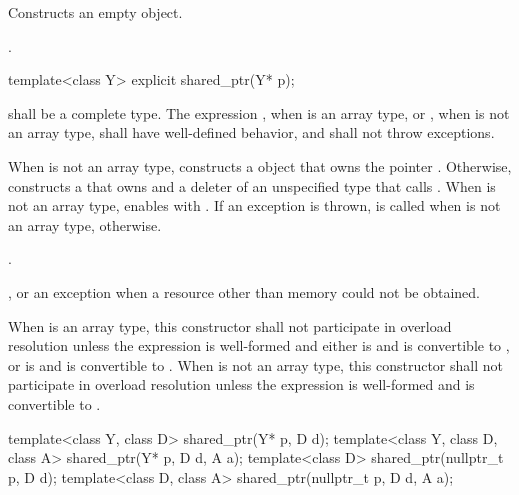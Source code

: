 \begin{itemdescr}
\pnum\effects  Constructs an empty  object.

\pnum\postconditions  {}.
\end{itemdescr}

%
\begin{itemdecl}
template<class Y> explicit shared_ptr(Y* p);
\end{itemdecl}

\begin{itemdescr}
\pnum\requires {} shall be a complete type. The expression
, when  is an array type, or
, when  is not an array type,
shall have well-defined behavior, and
shall not throw exceptions.

\pnum\effects When  is not an array type,
constructs a  object
that owns the pointer .
Otherwise, constructs a 
that owns  and a deleter of an
unspecified type that calls .
When  is not an array type,
enables  with .
If an exception is thrown,  is called
when  is not an array type,  otherwise.

\pnum\postconditions  {}.

\pnum\throws {}, or an  exception when a resource other than memory could not be obtained.

\pnum\remarks When  is an array type,
this constructor shall not participate in overload resolution unless
the expression  is well-formed and either
 is  and  is convertible to , or
 is  and  is convertible to .
When  is not an array type,
this constructor shall not participate in overload resolution unless
the expression  is well-formed and
 is convertible to .
\end{itemdescr}

%
\begin{itemdecl}
template<class Y, class D> shared_ptr(Y* p, D d);
template<class Y, class D, class A> shared_ptr(Y* p, D d, A a);
template<class D> shared_ptr(nullptr_t p, D d);
template<class D, class A> shared_ptr(nullptr_t p, D d, A a);
\end{itemdecl}


